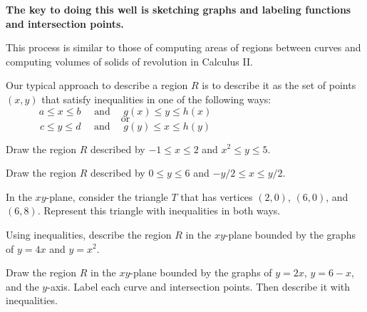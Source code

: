 \begin{center}
    \textbf{The key to doing this well is sketching graphs and labeling functions \\ and intersection points.}
\end{center} 
This process is similar to those of computing areas of regions between curves and computing volumes of solids of revolution in Calculus II.

Our typical approach to describe a region $R$ is to describe it as the set of points $(x,y)$ that satisfy inequalities in one of the following ways:
\[
    a\le x\le b\quad \text{ and } \quad g(x)\le y\le h(x)\hspace{2in}\mbox{}
\] 
\[
    \text{ or }\hspace{2in}\mbox{}
\] 
\[
    c\le y\le d \quad \text{ and } \quad g(y)\le x\le h(y)\hspace{2in}\mbox{}
\]
\pagebreak 

\begin{ex}
    Draw the region $R$ described by $-1\le x\le 2$ and $x^2\le y\le 5$.
\end{ex}

\vfill

\begin{ex}
    Draw the region $R$ described by $0\le y\le 6$ and $-y/2\le x\le y/2$.
\end{ex} 

\vfill 

\pagebreak 

\begin{ex}\label{ex:region-inequalities}
    In the $xy$-plane, consider the triangle $T$ that has vertices $(2,0)$, $(6,0)$, and $(6,8)$. Represent this triangle with inequalities in both ways.
\end{ex}

\vfill

\begin{ex}
    Using inequalities, describe the region $R$ in the $xy$-plane bounded by the graphs of $y=4x$ and $y=x^2$.  %
\end{ex}

\vfill



\pagebreak 
\begin{ex}
    Draw the region $R$ in the $xy$-plane bounded by the graphs of $y=2x$, $y=6-x$, and the $y$-axis. Label each curve and intersection points. Then describe it with inequalities.
\end{ex}

